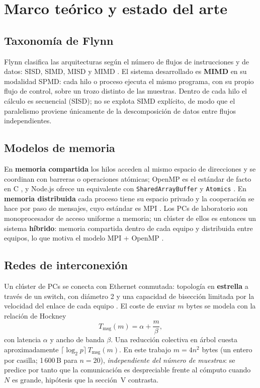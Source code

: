 \documentclass[conference]{IEEEtran}
\begin{document}
\section{Marco te\'orico y estado del arte}
\subsection{Taxonom\'ia de Flynn}
Flynn clasifica las arquitecturas seg\'un el n\'umero de flujos de instrucciones y de datos: SISD, SIMD, MISD y MIMD \cite{flynn1966}. El sistema desarrollado es \textbf{MIMD} en su modalidad SPMD: cada hilo o proceso ejecuta el mismo programa, con su propio flujo de control, sobre un trozo distinto de las muestras. Dentro de cada hilo el c\'alculo es secuencial (SISD); no se explota SIMD expl\'icito, de modo que el paralelismo proviene \'unicamente de la descomposici\'on de datos entre flujos independientes.

\subsection{Modelos de memoria}
En \textbf{memoria compartida} los hilos acceden al mismo espacio de direcciones y se coordinan con barreras o operaciones at\'omicas; OpenMP es el est\'andar de facto en C \cite{dagum1998,openmp52}, y Node.js ofrece un equivalente con \texttt{SharedArrayBuffer} y \texttt{Atomics} \cite{nodejsworker}. En \textbf{memoria distribuida} cada proceso tiene su espacio privado y la cooperaci\'on se hace por paso de mensajes, cuyo est\'andar es MPI \cite{mpi40}. Los PCs de laboratorio son monoprocesador de acceso uniforme a memoria; un cl\'uster de ellos es entonces un sistema \textbf{h\'ibrido}: memoria compartida dentro de cada equipo y distribuida entre equipos, lo que motiva el modelo MPI + OpenMP \cite{pacheco2011,grama2003}.

\subsection{Redes de interconexi\'on}
Un cl\'uster de PCs se conecta con Ethernet conmutada: topolog\'ia en \textbf{estrella} a trav\'es de un switch, con di\'ametro 2 y una capacidad de bisecci\'on limitada por la velocidad del enlace de cada equipo \cite{grama2003}. El coste de enviar $m$ bytes se modela con la relaci\'on de Hockney \cite{hockney1994}
\begin{equation}\label{eq:hockney}
T_{\mathrm{msg}}(m)=\alpha+\frac{m}{\beta},
\end{equation}
con latencia $\alpha$ y ancho de banda $\beta$. Una reducci\'on colectiva en \'arbol cuesta aproximadamente $\lceil\log_2 p\rceil\,T_{\mathrm{msg}}(m)$. En este trabajo $m=4n^2$ bytes (un entero por casilla; 1\,600\,B para $n=20$), \emph{independiente del n\'umero de muestras}: se predice por tanto que la comunicaci\'on es despreciable frente al c\'omputo cuando $N$ es grande, hip\'otesis que la secci\'on~V contrasta.
\end{document}
